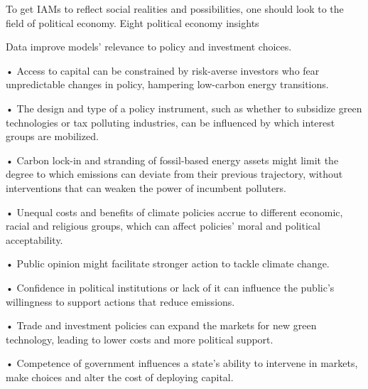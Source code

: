 \documentclass[
]{book}
\begin{document}
To get IAMs to reflect social realities and possibilities, one should look to the field of political economy.
Eight political economy insights

Data improve models' relevance to policy and investment choices.

• Access to capital can be constrained by risk-averse investors who fear unpredictable changes in policy, hampering low-carbon energy transitions.

• The design and type of a policy instrument, such as whether to subsidize green technologies or tax polluting industries, can be influenced by which interest groups are mobilized.

• Carbon lock-in and stranding of fossil-based energy assets might limit the degree to which emissions can deviate from their previous trajectory, without interventions that can weaken the power of incumbent polluters.

• Unequal costs and benefits of climate policies accrue to different economic, racial and religious groups, which can affect policies' moral and political acceptability.

• Public opinion might facilitate stronger action to tackle climate change.

• Confidence in political institutions or lack of it can influence the public's willingness to support actions that reduce emissions.

• Trade and investment policies can expand the markets for new green technology, leading to lower costs and more political support.

• Competence of government influences a state's ability to intervene in markets, make choices and alter the cost of deploying capital.
\end{document}
